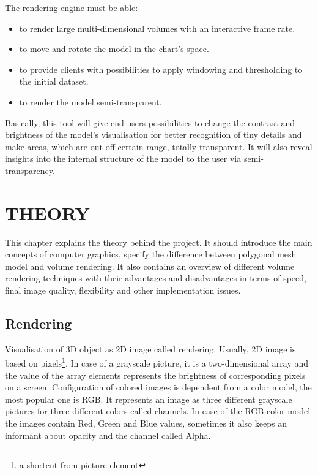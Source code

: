 \documentclass[twoside, english, 11pt]{report}
\begin{document}
The rendering engine must be able:
\begin{itemize} 
\item to render large multi-dimensional volumes with an interactive frame rate.
\item to move and rotate the model in the chart's space.
\item to provide clients with possibilities to apply windowing and thresholding to the initial dataset.
\item to render the model semi-transparent.
\end{itemize}

Basically, this tool will give end users possibilities to change the contrast and brightness of the model's visualisation for better recognition of tiny details and make areas, which are out off certain range, totally transparent. It will also reveal insights into the internal structure of the model to the user via semi-transparency.

\chapter{THEORY}

This chapter explains the theory behind the project. It should introduce the main concepts of computer graphics, specify the difference between polygonal mesh model and volume rendering. It also contains an overview of different volume rendering techniques with their advantages and disadvantages in terms of speed, final image quality, flexibility and other implementation issues.

\section{Rendering}

Visualisation of 3D object as 2D image called rendering. Usually, 2D image is based on pixels\footnote{a shortcut from picture element}. In case of a grayscale picture, it is a two-dimensional array and the value of the array elements represents the brightness of corresponding pixels on a screen. Configuration of colored images is dependent from a color model, the most popular one is RGB. It represents an image as three different grayscale pictures for three different colors called channels. In case of the RGB color model the images contain Red, Green and Blue values, sometimes it also keeps an informant about opacity and the channel called Alpha.\\
\end{document}
